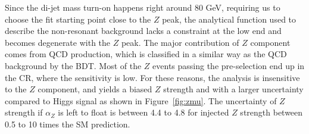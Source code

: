 Since the di-jet mass turn-on happens right around 80 GeV, requiring us to choose the fit starting point close to the $Z$ peak, the analytical function used to describe the non-resonant background lacks a constraint at the low end and becomes degenerate with the $Z$ peak. The major contribution of $Z$ component comes from QCD production, which is classified in a similar way as the QCD background by the BDT.  Most of the $Z$ events passing the pre-selection end up in the CR, where the sensitivity is low.  For these reasons, the analysis is insensitive to the $Z$ component, and yields a biased $Z$ strength and with a larger uncertainty compared to Higgs signal as shown in Figure~\ref{fig:zmu}. The uncertainty of $Z$ strength if $\alpha_Z$ is left to float is between 4.4 to 4.8 for injected $Z$ strength between 0.5 to 10 times the SM prediction. 


